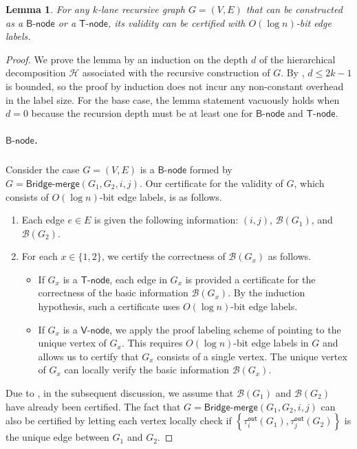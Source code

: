 \documentclass[11pt]{article}
\newtheorem{lemma}{Lemma}[section]
\theoremstyle{definition}
\theoremstyle{remark}
\newcommand{\tout}{\tau^{\mathsf{out}}}
\newcommand{\bmerge}{\mathsf{Bridge}\text{-}\mathsf{merge}}
\newcommand{\vnode}{\mathsf{V}\text{-}\mathsf{node}}
\newcommand{\bnode}{\mathsf{B}\text{-}\mathsf{node}}
\newcommand{\tnode}{\mathsf{T}\text{-}\mathsf{node}}
\begin{document}
\begin{lemma}\label{lem:inductive_case}
For any $k$-lane recursive graph $G=(V,E)$ that can be constructed as a $\bnode$ or a $\tnode$, its validity can be certified with $O(\log n)$-bit edge labels. 
\end{lemma}
\begin{proof}
 We prove the lemma by an induction on the depth $d$ of the hierarchical decomposition $\mathcal{H}$ associated with the recursive construction of $G$. By , $d \leq 2k-1$ is bounded, so the proof by induction does not incur any non-constant overhead in the label size.
 For the base case, the lemma statement vacuously holds when $d = 0$ because the recursion depth must be at least one for $\bnode$ and $\tnode$.

 \subparagraph{$\bnode$.} Consider the case $G=(V,E)$ is a $\bnode$ formed by $G=\bmerge(G_1, G_2, i, j)$. Our certificate for the validity of $G$, which consists of $O(\log n)$-bit edge labels, is as follows.
 \begin{enumerate}
     \item Each edge $e \in E$ is given the following information: $(i,j)$, $\mathcal{B}(G_1)$, and $\mathcal{B}(G_2)$.
     \item \label{item-2} For each $x \in \{1,2\}$, we certify the correctness of $\mathcal{B}(G_x)$ as follows.
     \begin{itemize}
         \item If $G_x$ is a $\tnode$, each edge in $G_x$ is provided a certificate for the correctness of the basic information $\mathcal{B}(G_x)$. By the induction hypothesis, such a certificate uses $O(\log n)$-bit edge labels. 
         \item If $G_x$ is a $\vnode$, we apply the proof labeling scheme of  pointing to the unique vertex of $G_x$. This requires $O(\log n)$-bit edge labels in $G$ and allows us to certify that $G_x$ consists of a single vertex. The unique vertex of $G_x$ can locally verify the basic information $\mathcal{B}(G_x)$.
     \end{itemize} 
 \end{enumerate} 

Due to , in the subsequent discussion, we assume that $\mathcal{B}(G_1)$ and $\mathcal{B}(G_2)$ have already been certified. The fact that $G=\bmerge(G_1, G_2, i, j)$ can also be certified by letting each vertex locally check if $\left\{\tout_i(G_1),\tout_j(G_2)\right\}$ is the unique edge between $G_1$ and $G_2$. 


\end{proof}
\end{document}
